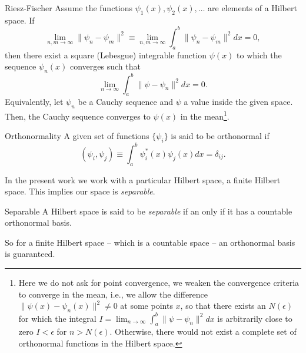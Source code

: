 \begin{theorem}{Riesz-Fischer}{}
Assume the functions $\psi_{1}(x),\psi_{2}(x),\ldots$ are elements of a Hilbert space. If
\begin{equation}
    \lim_{n,m\to\infty} \lVert \psi_{n} - \psi_{m}\rVert^{2} \equiv \lim_{n,m\to \infty} \int_{a}^{b} \|\psi_{n} - \psi_{m}\|^{2}dx = 0,
\end{equation}
then there exist a square (Lebesgue) integrable function $\psi(x)$ to which the sequence $\psi_{n}(x)$ converges such that 
\begin{equation}
    \lim_{n\to \infty} \int_{a}^{b} \|\psi - \psi_{n}\|^{2}dx = 0.
\end{equation}
Equivalently, let $\psi_{n}$ be a Cauchy sequence and $\psi$ a value inside the given space. Then, the Cauchy sequence converges to $\psi(x)$ in the mean\footnote{Here we do not ask for point convergence, we weaken the convergence criteria to converge in the mean, i.e., we allow the difference $\|\psi(x) - \psi_{n}(x)\|^{2}\neq 0$ at some points $x$, so that there exists an $N(\epsilon)$ for which the integral $I =\lim_{n\to \infty} \int_{a}^{b} \|\psi - \psi_{n}\|^{2}dx$ is arbitrarily close to zero $I<\epsilon$ for $n>N(\epsilon)$. Otherwise, there would not exist a complete set of orthonormal functions in the Hilbert space.}. 
\end{theorem}
\begin{definition}{Orthonormality}{}
A given set of functions $\{\psi_{i}\}$ is said to be orthonormal if
\begin{equation}
    \left(\psi_{i}, \psi_{j}\right) \equiv \int_{a}^{b} \psi_{i}^{*}(x)\psi_{j}(x) dx = \delta_{ij}. 
\end{equation}
\end{definition}
In the present work we work with a particular Hilbert space, a finite Hilbert space. This implies our space is \textit{separable}.
\begin{definition}{Separable}{}
    A Hilbert space is said to be \textit{separable} if an only if it has a countable orthonormal basis.
\end{definition}
So for a finite Hilbert space -- which is a countable space -- an orthonormal basis is guaranteed.
